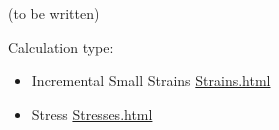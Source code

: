 (to be written)

Calculation type:
\begin{itemize}
  \item {Incremental Small Strains \href{https://mooseframework.inl.gov/modules/solid_mechanics/Strains.html}{Strains.html} }
  \item {Stress \href{https://mooseframework.inl.gov/modules/solid_mechanics/Stresses.html}{Stresses.html}}
\end{itemize}